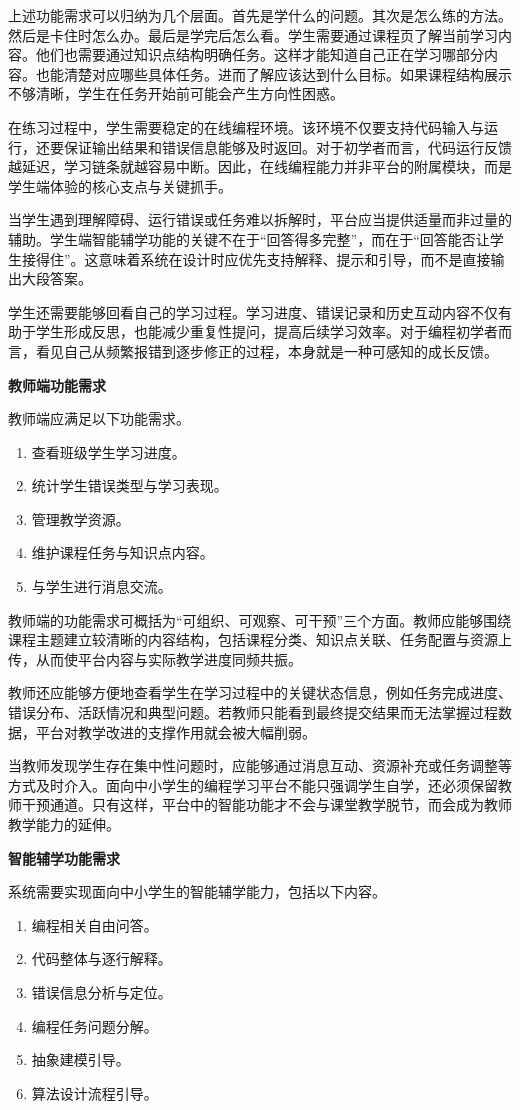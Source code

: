 上述功能需求可以归纳为几个层面。首先是学什么的问题。其次是怎么练的方法。然后是卡住时怎么办。最后是学完后怎么看。学生需要通过课程页了解当前学习内容。他们也需要通过知识点结构明确任务。这样才能知道自己正在学习哪部分内容。也能清楚对应哪些具体任务。进而了解应该达到什么目标。如果课程结构展示不够清晰，学生在任务开始前可能会产生方向性困惑。

在练习过程中，学生需要稳定的在线编程环境。该环境不仅要支持代码输入与运行，还要保证输出结果和错误信息能够及时返回。对于初学者而言，代码运行反馈越延迟，学习链条就越容易中断。因此，在线编程能力并非平台的附属模块，而是学生端体验的核心支点与关键抓手。

当学生遇到理解障碍、运行错误或任务难以拆解时，平台应当提供适量而非过量的辅助。学生端智能辅学功能的关键不在于“回答得多完整”，而在于“回答能否让学生接得住”。这意味着系统在设计时应优先支持解释、提示和引导，而不是直接输出大段答案。

学生还需要能够回看自己的学习过程。学习进度、错误记录和历史互动内容不仅有助于学生形成反思，也能减少重复性提问，提高后续学习效率。对于编程初学者而言，看见自己从频繁报错到逐步修正的过程，本身就是一种可感知的成长反馈。

\textbf{教师端功能需求}

教师端应满足以下功能需求。
\begin{enumerate}
  \item 查看班级学生学习进度。
  \item 统计学生错误类型与学习表现。
  \item 管理教学资源。
  \item 维护课程任务与知识点内容。
  \item 与学生进行消息交流。
\end{enumerate}

教师端的功能需求可概括为“可组织、可观察、可干预”三个方面。教师应能够围绕课程主题建立较清晰的内容结构，包括课程分类、知识点关联、任务配置与资源上传，从而使平台内容与实际教学进度同频共振。

教师还应能够方便地查看学生在学习过程中的关键状态信息，例如任务完成进度、错误分布、活跃情况和典型问题。若教师只能看到最终提交结果而无法掌握过程数据，平台对教学改进的支撑作用就会被大幅削弱。

当教师发现学生存在集中性问题时，应能够通过消息互动、资源补充或任务调整等方式及时介入。面向中小学生的编程学习平台不能只强调学生自学，还必须保留教师干预通道。只有这样，平台中的智能功能才不会与课堂教学脱节，而会成为教师教学能力的延伸。

\textbf{智能辅学功能需求}

系统需要实现面向中小学生的智能辅学能力，包括以下内容。
\begin{enumerate}
  \item 编程相关自由问答。
  \item 代码整体与逐行解释。
  \item 错误信息分析与定位。
  \item 编程任务问题分解。
  \item 抽象建模引导。
  \item 算法设计流程引导。
\end{enumerate}

